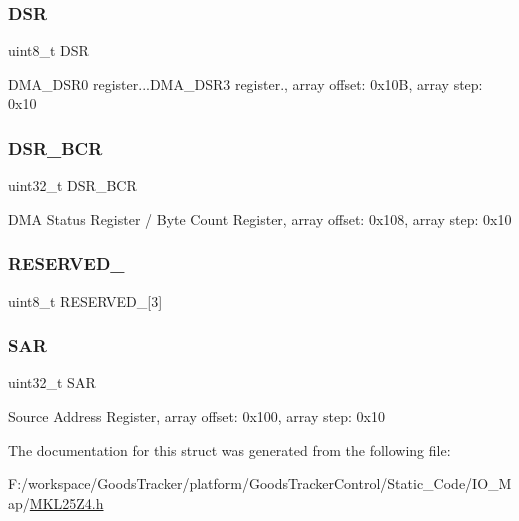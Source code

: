 \mbox{\label{struct_d_m_a___mem_map_af59ac6c373e8107836aab76df475a6cd}} 
\subsubsection{\texorpdfstring{D\+SR}{DSR}}
{\footnotesize\ttfamily uint8\+\_\+t D\+SR}

D\+M\+A\+\_\+\+D\+S\+R0 register...D\+M\+A\+\_\+\+D\+S\+R3 register., array offset\+: 0x10B, array step\+: 0x10 \mbox{\label{struct_d_m_a___mem_map_ae7642b2f08448a1bd463111a464f8e46}} 
\subsubsection{\texorpdfstring{D\+S\+R\+\_\+\+B\+CR}{DSR\_BCR}}
{\footnotesize\ttfamily uint32\+\_\+t D\+S\+R\+\_\+\+B\+CR}

D\+MA Status Register / Byte Count Register, array offset\+: 0x108, array step\+: 0x10 \mbox{\label{struct_d_m_a___mem_map_aa8b44414dcc95e749d18ce191f6a5c44}} 
\subsubsection{\texorpdfstring{R\+E\+S\+E\+R\+V\+E\+D\+\_}{RESERVED\_0}}
{\footnotesize\ttfamily uint8\+\_\+t R\+E\+S\+E\+R\+V\+E\+D\+\_\mbox{[}3\mbox{]}}

\mbox{\label{struct_d_m_a___mem_map_a9f71dcd898faa75d4e2d1e8cace3882f}} 
\subsubsection{\texorpdfstring{S\+AR}{SAR}}
{\footnotesize\ttfamily uint32\+\_\+t S\+AR}

Source Address Register, array offset\+: 0x100, array step\+: 0x10 

The documentation for this struct was generated from the following file\+:\begin{DoxyCompactItemize}
\item 
F\+:/workspace/\+Goods\+Tracker/platform/\+Goods\+Tracker\+Control/\+Static\+\_\+\+Code/\+I\+O\+\_\+\+Map/\hyperlink{_m_k_l25_z4_8h}{M\+K\+L25\+Z4.\+h}\end{DoxyCompactItemize}
